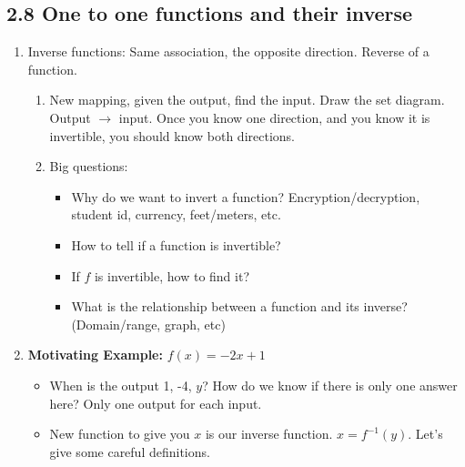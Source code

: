 \documentclass{article}
\begin{document}
\subsection{2.8 One to one functions and their inverse}

\begin{enumerate}
\item Inverse functions: Same association, the opposite direction. Reverse of a function.
\begin{enumerate}

\item New mapping, given the output, find the input. Draw the set diagram. Output $\rightarrow $ input. Once you know one direction, and you know it is invertible, you should know both directions.

\item Big questions:
\begin{itemize}
\item Why do we want to invert a function? Encryption/decryption, student id, currency, feet/meters, etc.
\item How to tell if a function is invertible?
\item If $f$ is invertible, how to find it?
\item What is the relationship between a function and its inverse? (Domain/range, graph, etc)
\end{itemize}
\end{enumerate}

\item {\bf Motivating Example:} $f(x) = -2x+1$ 
\begin{itemize}
\item When is the output 1, -4, $y$? How do we know if there is only one answer here? Only one output for each input.
\item New function to give you $x$ is our inverse function. $x=f^{-1}(y)$. Let's give some careful definitions.
\end{itemize}


\end{enumerate}
\end{document}
